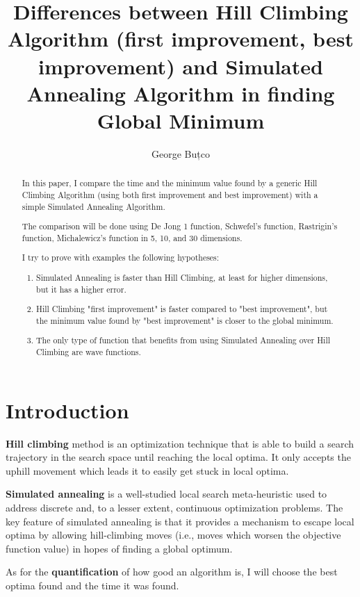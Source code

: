 \documentclass{article}
\title{Differences between Hill Climbing Algorithm (first improvement, best improvement) and Simulated Annealing Algorithm in finding Global Minimum }
\author{George Buțco}
\begin{document}
\maketitle
\begin{abstract}
In this paper, I compare the time and the minimum value found by a generic Hill Climbing Algorithm (using both first improvement and best improvement) with a simple Simulated Annealing Algorithm.

The comparison will be done using De Jong 1 function\cite{deJong}, Schwefel's function\cite{jamil2013literature}, Rastrigin's function\cite{rastrigin}, Michalewicz's function\cite{back1997handbook} in 5, 10, and 30 dimensions.

I try to prove with examples the following hypotheses:

\begin{enumerate}
  \item Simulated Annealing is faster than Hill Climbing, at least for higher dimensions, but it has a higher error.
  \item Hill Climbing "first improvement" is faster compared to "best improvement", but the minimum value found by "best improvement" is closer to the global minimum.
  \item The only type of function that benefits from using Simulated Annealing over Hill Climbing are wave functions.
\end{enumerate}

\end{abstract}
\section{Introduction}

\textbf{Hill climbing} method is an optimization technique that is able to build a search trajectory in the search space until reaching the local optima. It only accepts the uphill movement which leads it to easily get stuck in local optima.\cite{al2017beta}

\textbf{Simulated annealing} is a well-studied local search meta-heuristic used to
address discrete and, to a lesser extent, continuous optimization problems. The key
feature of simulated annealing is that it provides a mechanism to escape local optima
by allowing hill-climbing moves (i.e., moves which worsen the objective function
value) in hopes of finding a global optimum.\cite{gendreau2010handbook}

As for the \textbf{quantification} of how good an algorithm is, I will choose the best optima found and the time it was found.
\newpage
\end{document}
